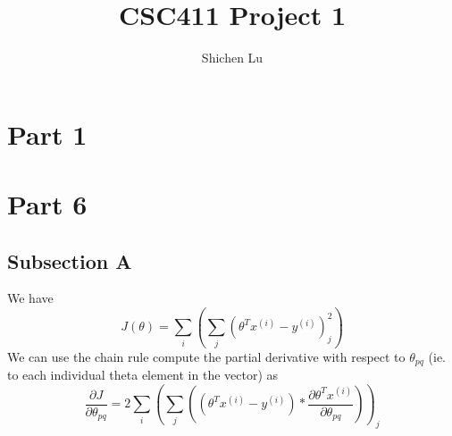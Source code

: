 \documentclass[11pt,a4paper]{report}
\author{Shichen Lu}
\title{CSC411 Project 1}
\begin{document}
\maketitle
\section*{Part 1}
\section*{Part 6}
\subsection*{Subsection A}
We have 
\begin{equation}
J(\theta)=\sum_i(\sum_j(\theta^T x^{(i)} - y^{(i)})^2_j)
\end{equation}
We can use the chain rule compute the partial derivative with respect to $\theta_{pq}$ (ie. to each individual theta element in the vector) as
\begin{equation}
\frac{\partial J}{\partial \theta_{pq}} = 2 \sum_i(\sum_j((\theta^T x^{(i)} - y^{(i)})*\frac{\partial \theta^T x^{(i)}}{\partial \theta_{pq}}))_j
\end{equation} 
\end{document}

